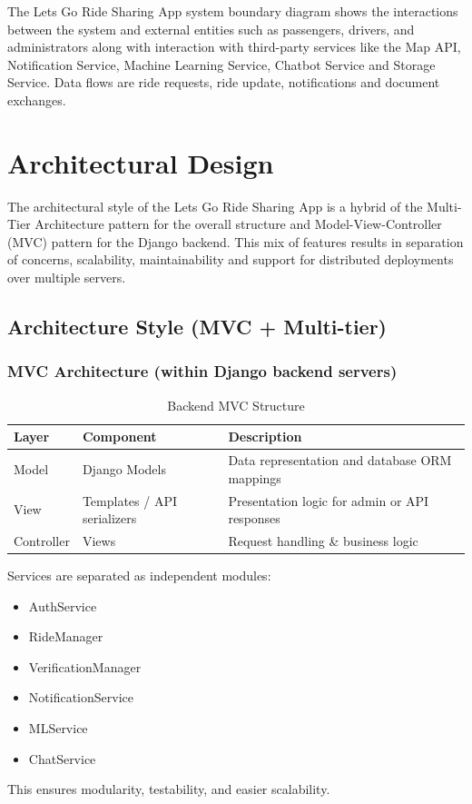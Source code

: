 The Lets Go Ride Sharing App system boundary diagram shows the interactions between the system and external entities such as passengers, drivers, and administrators along with interaction with third-party services like the Map API, Notification Service, Machine Learning Service, Chatbot Service and Storage Service. Data flows are ride requests, ride update, notifications and document exchanges.

\section{Architectural Design}

The architectural style of the Lets Go Ride Sharing App is a hybrid of the Multi-Tier Architecture pattern for the overall structure and Model-View-Controller (MVC) pattern for the Django backend. This mix of features results in separation of concerns, scalability, maintainability and support for distributed deployments over multiple servers.

\subsection{Architecture Style (MVC + Multi-tier)}

\subsubsection{MVC Architecture (within Django backend servers)}

\begin{table}[htbp]
\centering
\caption{Backend MVC Structure}
\renewcommand{\arraystretch}{1.3}
\begin{tabularx}{\textwidth}{|X|X|X|}
\hline
\textbf{Layer} & \textbf{Component} & \textbf{Description} \\
\hline
Model & Django Models & Data representation and database ORM mappings \\
\hline
View & Templates / API serializers & Presentation logic for admin or API responses \\
\hline
Controller & Views & Request handling \& business logic \\
\hline
\end{tabularx}
\end{table}

Services are separated as independent modules:
\begin{itemize}
    \item AuthService
    \item RideManager
    \item VerificationManager
    \item NotificationService
    \item MLService
    \item ChatService
\end{itemize}
This ensures modularity, testability, and easier scalability.

